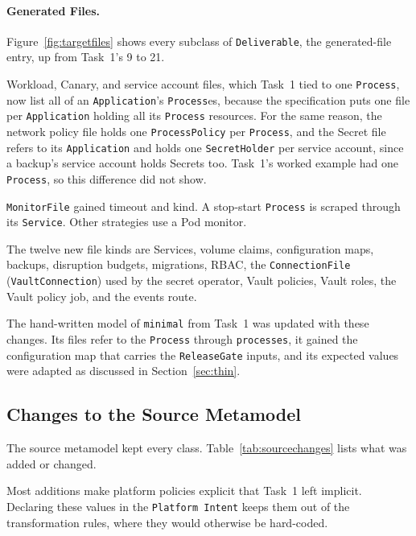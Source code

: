 \paragraph{Generated Files.} Figure~\ref{fig:targetfiles} shows every
subclass of \texttt{Deliverable}, the generated-file entry, up from Task~1's 9 to 21.

Workload, Canary, and service account files, which Task~1 tied to one
\texttt{Process}, now list all of an \texttt{Application}'s \texttt{Process}es,
because the specification puts one file per \texttt{Application} holding all
its \texttt{Process} resources. For the same reason, the network
policy file holds one \texttt{ProcessPolicy} per \texttt{Process}, and the Secret file refers
to its \texttt{Application} and holds one \texttt{SecretHolder} per service account, since a backup's service account
holds Secrets too. Task~1's worked example had
one \texttt{Process}, so this difference did not show.

\texttt{MonitorFile} gained timeout and kind. A stop-start \texttt{Process}
is scraped through its \texttt{Service}. Other strategies use a Pod monitor.

The twelve new file kinds are Services, volume claims, configuration maps,
backups, disruption budgets, migrations, RBAC, the \texttt{ConnectionFile}
(\texttt{VaultConnection}) used by the secret operator, Vault policies, Vault roles, the Vault policy job, and the events route.



The hand-written model of \texttt{minimal} from Task~1 was updated with these
changes. Its files refer to the \texttt{Process} through \texttt{processes},
it gained the configuration map that carries the \texttt{ReleaseGate} inputs,
and its expected values were adapted as discussed in Section~\ref{sec:thin}.

\subsection{Changes to the Source Metamodel}
\label{app:source}

The source metamodel kept every class. Table~\ref{tab:sourcechanges} lists
what was added or changed.

Most additions make platform policies explicit that Task~1 left implicit.
Declaring these values in the \texttt{Platform Intent} keeps them out of
the transformation rules, where they would otherwise be hard-coded.

